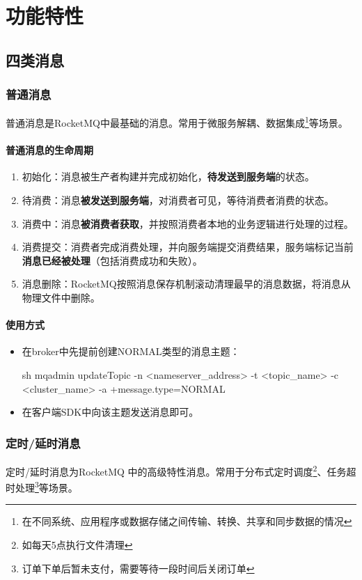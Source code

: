 \documentclass[11pt, a4paper, oneside, fontset=none]{ctexbook}
\begin{document}
\chapter{功能特性}
\section{四类消息}
\subsection{普通消息}
普通消息是RocketMQ中最基础的消息。常用于微服务解耦、数据集成\footnote{在不同系统、应用程序或数据存储之间传输、转换、共享和同步数据的情况}等场景。

\subsubsection{普通消息的生命周期}
\begin{enumerate}
  \item 初始化：消息被生产者构建并完成初始化，{\bfseries\kaishu 待发送到服务端}的状态。
  \item 待消费：消息{\bfseries\kaishu 被发送到服务端}，对消费者可见，等待消费者消费的状态。
  \item 消费中：消息{\bfseries\kaishu 被消费者获取}，并按照消费者本地的业务逻辑进行处理的过程。 
  \item 消费提交：消费者完成消费处理，并向服务端提交消费结果，服务端标记当前{\bfseries\kaishu 消息已经被处理}（包括消费成功和失败）。
  \item 消息删除：RocketMQ按照消息保存机制滚动清理最早的消息数据，将消息从物理文件中删除。
\end{enumerate}

\subsubsection{使用方式}
\begin{itemize}
  \item 在broker中先提前创建NORMAL类型的消息主题：
  \begin{bash}
    sh mqadmin updateTopic -n <nameserver_address> -t <topic_name> -c <cluster_name> -a +message.type=NORMAL
  \end{bash}
  \item 在客户端SDK中向该主题发送消息即可。
\end{itemize}

\subsection{定时/延时消息}
定时/延时消息为RocketMQ 中的高级特性消息。常用于分布式定时调度\footnote{如每天5点执行文件清理}、任务超时处理\footnote{订单下单后暂未支付，需要等待一段时间后关闭订单}等场景。
\end{document}
